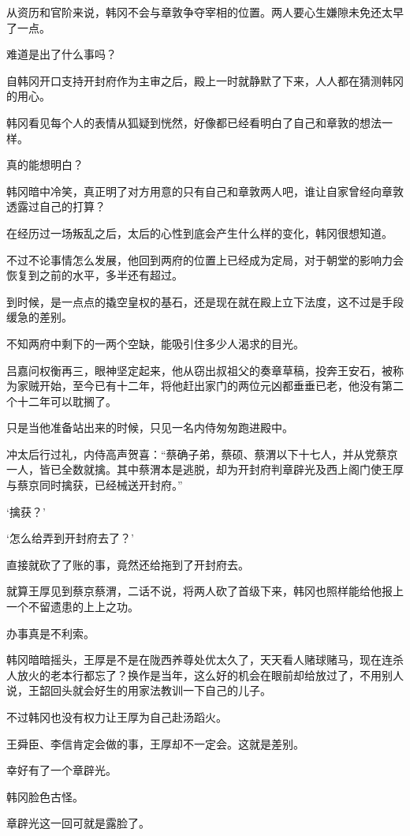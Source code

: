 从资历和官阶来说，韩冈不会与章敦争夺宰相的位置。两人要心生嫌隙未免还太早了一点。

难道是出了什么事吗？

自韩冈开口支持开封府作为主审之后，殿上一时就静默了下来，人人都在猜测韩冈的用心。

韩冈看见每个人的表情从狐疑到恍然，好像都已经看明白了自己和章敦的想法一样。

真的能想明白？

韩冈暗中冷笑，真正明了对方用意的只有自己和章敦两人吧，谁让自家曾经向章敦透露过自己的打算？

在经历过一场叛乱之后，太后的心性到底会产生什么样的变化，韩冈很想知道。

不过不论事情怎么发展，他回到两府的位置上已经成为定局，对于朝堂的影响力会恢复到之前的水平，多半还有超过。

到时候，是一点点的撬空皇权的基石，还是现在就在殿上立下法度，这不过是手段缓急的差别。

不知两府中剩下的一两个空缺，能吸引住多少人渴求的目光。

吕嘉问权衡再三，眼神坚定起来，他从窃出叔祖父的奏章草稿，投奔王安石，被称为家贼开始，至今已有十二年，将他赶出家门的两位元凶都垂垂已老，他没有第二个十二年可以耽搁了。

只是当他准备站出来的时候，只见一名内侍匆匆跑进殿中。

冲太后行过礼，内侍高声贺喜：“蔡确子弟，蔡硕、蔡渭以下十七人，并从党蔡京一人，皆已全数就擒。其中蔡渭本是逃脱，却为开封府判章辟光及西上阁门使王厚与蔡京同时擒获，已经械送开封府。”

‘擒获？’

‘怎么给弄到开封府去了？’

直接就砍了了账的事，竟然还给拖到了开封府去。

就算王厚见到蔡京蔡渭，二话不说，将两人砍了首级下来，韩冈也照样能给他报上一个不留遗患的上上之功。

办事真是不利索。

韩冈暗暗摇头，王厚是不是在陇西养尊处优太久了，天天看人赌球赌马，现在连杀人放火的老本行都忘了？换作是当年，这么好的机会在眼前却给放过了，不用别人说，王韶回头就会好生的用家法教训一下自己的儿子。

不过韩冈也没有权力让王厚为自己赴汤蹈火。

王舜臣、李信肯定会做的事，王厚却不一定会。这就是差别。

幸好有了一个章辟光。

韩冈脸色古怪。

章辟光这一回可就是露脸了。

